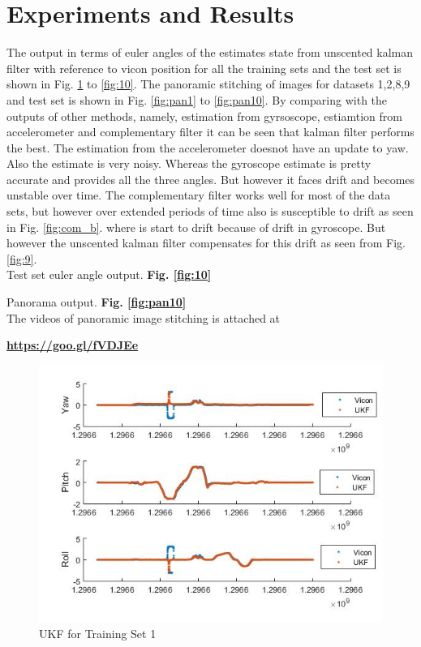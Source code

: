 \documentclass[fleqn,10pt]{SelfArx} %
\begin{document}
\section{Experiments and Results}
\label{sec:results}
The output in terms of euler angles of the estimates state from unscented kalman filter with reference to vicon position for all the training sets and the test set is shown in Fig. \ref{fig:1} to \ref{fig:10}. The panoramic stitching of images for datasets 1,2,8,9 and test set is shown in Fig. \ref{fig:pan1} to \ref{fig:pan10}.
By comparing with the outputs of other methods, namely, estimation from gyrsoscope, estiamtion from accelerometer and complementary filter it can be seen that kalman filter performs the best. The estimation from the accelerometer doesnot have an update to yaw. Also the estimate is very noisy. Whereas the gyroscope estimate is pretty accurate and provides all the three angles. But however it faces drift and becomes unstable over time. The complementary filter works well for most of the data sets, but however over extended periods of time also is susceptible to drift as seen in Fig. \ref{fig:com_b}. where is start to drift because of drift in gyroscope. But however the unscented kalman filter compensates for this drift as seen from Fig. \ref{fig:9}. \\ 

Test set euler angle output. \textbf{Fig. \ref{fig:10}}

Panorama output. \textbf{Fig. \ref{fig:pan10}}\\
The videos of panoramic image stitching is attached at

\textbf{\hyperref[https://goo.gl/fVDJEe]{https://goo.gl/fVDJEe}}
\hspace{-1cm}
\begin{figure}[hbtp]
\centering
\includegraphics[scale=0.45]{1.jpg}
\caption{UKF for Training Set 1}
\label{fig:1}
\end{figure}
\end{document}
